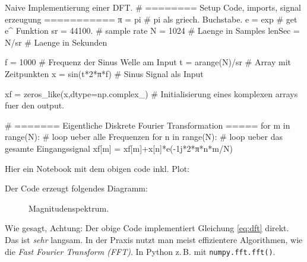 \begin{python}{Naive Implementierung einer DFT.}
# ======== Setup Code, imports, signal erzeugung ===========
π = pi # pi als griech. Buchstabe.
e = exp # get e^ Funktion
sr = 44100. # sample rate
N = 1024 # Laenge in Samples
lenSec = N/sr # Laenge in Sekunden

f = 1000 # Frequenz der Sinus Welle am Input
t = arange(N)/sr # Array mit Zeitpunkten
x = sin(t*2*π*f) # Sinus Signal als Input

xf = zeros_like(x,dtype=np.complex_) # Initialisierung eines komplexen arrays fuer den output.

# ======= Eigentliche Diskrete Fourier Transformation =====
for m in range(N): # loop ueber alle Frequenzen
    for n in range(N): # loop ueber das gesamte Eingangssignal
        xf[m] = xf[m]+x[n]*e(-1j*2*π*n*m/N)
\end{python}

Hier ein Notebook mit dem obigen code inkl. Plot:


Der Code erzeugt folgendes Diagramm:

\begin{figure}[H]
    \centering
    
    \caption{Magnitudenspektrum.}
    \label{fig:specNaive}
\end{figure}

Wie gesagt, Achtung: Der obige Code implementiert Gleichung \ref{eq:dft} direkt. Das ist \textit{sehr} langsam. In der Praxis nutzt man meist effizientere Algorithmen, wie die \emph{Fast Fourier Transform (FFT)}. In Python z.\,B. mit \texttt{numpy.fft.fft()}. 


